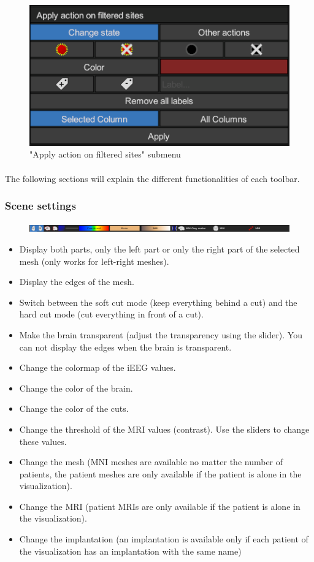 \documentclass[a4paper]{article}
\begin{document}
\begin{figure}[H]
\begin{center}
\includegraphics[scale=0.5]{SitesAction.png}
\end{center}
\caption{\label{sitesAction}"Apply action on filtered sites" submenu}
\end{figure}
\paragraph{} The following sections will explain the different functionalities of each toolbar.
\subsubsection{Scene settings}
\begin{figure}[H]
\begin{center}
\includegraphics[scale=0.5]{SceneSettings.png}
\end{center}
\end{figure}
\begin{itemize}
\item Display both parts, only the left part or only the right part of the selected mesh (only works for left-right meshes).
\item Display the edges of the mesh.
\item Switch between the soft cut mode (keep everything behind a cut) and the hard cut mode (cut everything in front of a cut).
\item Make the brain transparent (adjust the transparency using the slider). You can not display the edges when the brain is transparent.
\item Change the colormap of the iEEG values.
\item Change the color of the brain.
\item Change the color of the cuts.
\item Change the threshold of the MRI values (contrast). Use the sliders to change these values.
\item Change the mesh (MNI meshes are available no matter the number of patients, the patient meshes are only available if the patient is alone in the visualization).
\item Change the MRI (patient MRIs are only available if the patient is alone in the visualization).
\item Change the implantation (an implantation is available only if each patient of the visualization has an implantation with the same name)
\end{itemize}
\end{document}
